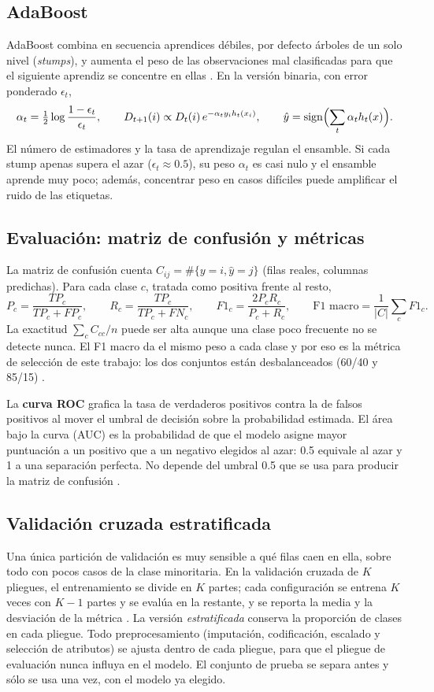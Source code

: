 \subsection{AdaBoost}
AdaBoost combina en secuencia aprendices débiles, por defecto árboles de un solo
nivel (\emph{stumps}), y aumenta el peso de las observaciones mal clasificadas para
que el siguiente aprendiz se concentre en ellas \cite{freund,sklearnada}. En la
versión binaria, con error ponderado $\epsilon_t$,
\[
 \alpha_t=\tfrac12\log\frac{1-\epsilon_t}{\epsilon_t},\qquad
 D_{t+1}(i)\propto D_t(i)\,e^{-\alpha_t y_i h_t(x_i)},\qquad
 \hat y=\operatorname{sign}\Bigl(\sum_t\alpha_t h_t(x)\Bigr).
\]
El número de estimadores y la tasa de aprendizaje regulan el ensamble. Si cada stump
apenas supera el azar ($\epsilon_t\approx0.5$), su peso $\alpha_t$ es casi nulo y el
ensamble aprende muy poco; además, concentrar peso en casos difíciles puede
amplificar el ruido de las etiquetas.

\subsection{Evaluación: matriz de confusión y métricas}
La matriz de confusión cuenta $C_{ij}=\#\{y=i,\hat y=j\}$ (filas reales, columnas
predichas). Para cada clase $c$, tratada como positiva frente al resto,
\[
 P_c=\frac{TP_c}{TP_c+FP_c},\qquad
 R_c=\frac{TP_c}{TP_c+FN_c},\qquad
 F1_c=\frac{2P_cR_c}{P_c+R_c},\qquad
 \text{F1 macro}=\frac1{|C|}\sum_c F1_c .
\]
La exactitud $\sum_c C_{cc}/n$ puede ser alta aunque una clase poco frecuente no se
detecte nunca. El F1 macro da el mismo peso a cada clase y por eso es la métrica de
selección de este trabajo: los dos conjuntos están desbalanceados (60/40 y 85/15)
\cite{sklearnmetrics,hegarcia}.

La \textbf{curva ROC} grafica la tasa de verdaderos positivos contra la de falsos
positivos al mover el umbral de decisión sobre la probabilidad estimada. El área
bajo la curva (AUC) es la probabilidad de que el modelo asigne mayor puntuación a un
positivo que a un negativo elegidos al azar: 0.5 equivale al azar y 1 a una
separación perfecta. No depende del umbral 0.5 que se usa para producir la matriz
de confusión \cite{fawcett}.

\subsection{Validación cruzada estratificada}
Una única partición de validación es muy sensible a qué filas caen en ella,
sobre todo con pocos casos de la clase minoritaria. En la validación cruzada de $K$
pliegues, el entrenamiento se divide en $K$ partes; cada configuración se entrena $K$
veces con $K-1$ partes y se evalúa en la restante, y se reporta la media y la
desviación de la métrica \cite{kohavi,sklearncv}. La versión \emph{estratificada}
conserva la proporción de clases en cada pliegue. Todo preprocesamiento (imputación,
codificación, escalado y selección de atributos) se ajusta dentro de cada pliegue,
para que el pliegue de evaluación nunca influya en el modelo. El conjunto de prueba
se separa antes y sólo se usa una vez, con el modelo ya elegido.

